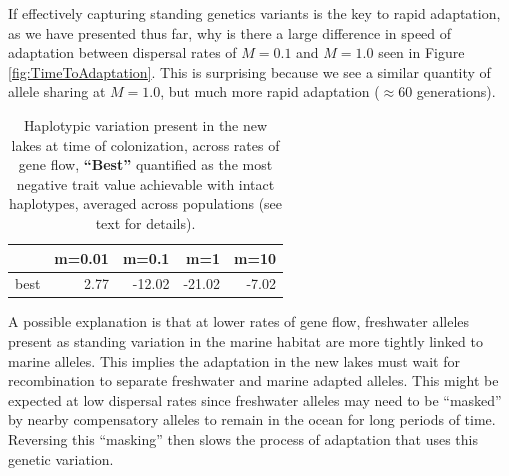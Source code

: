 \documentclass{article}
\begin{document}
If effectively capturing standing genetics variants is the key to rapid adaptation, as we have presented thus far, why is there a large difference in speed of adaptation between dispersal rates of $M = 0.1$ and $M = 1.0$ seen in Figure \ref{fig:TimeToAdaptation}. 
This is surprising because we see a similar quantity of allele sharing at  $M = 1.0$, but much more rapid adaptation ($\approx 60$ generations).

\begin{table}[ht]
    \centering
    \begin{tabular}{rrrrr}
      \hline
     & m=0.01 & m=0.1 & m=1 & m=10 \\ 
      \hline
          best & 2.77 & -12.02 & -21.02 & -7.02 \\ 
       \hline
    \end{tabular}
    \caption{
        Haplotypic variation present in the new lakes at time of colonization,
        across rates of gene flow,
        \textbf{``Best''} 
        quantified as the most negative trait value achievable
        with intact haplotypes, averaged across populations
        (see text for details).
    } \label{tab:linkage}
\end{table}

A possible explanation is that at lower rates of gene flow, freshwater alleles present as standing variation in the marine habitat are more tightly linked to marine alleles. This implies the adaptation in the new lakes must wait for recombination to separate freshwater and marine adapted alleles. This might be expected at low dispersal rates since freshwater alleles may need to be ``masked'' by nearby compensatory alleles to remain in the ocean for long periods of time. Reversing this ``masking'' then slows the process of adaptation that uses this genetic variation.
\end{document}
